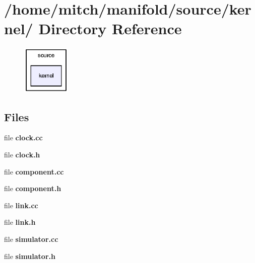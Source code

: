 \section{/home/mitch/manifold/source/kernel/ Directory Reference}
\label{dir_20aff94f87d25d69b06593913066a51b}


\nopagebreak
\begin{figure}[H]
\begin{center}
\leavevmode
\includegraphics[width=65pt]{dir_20aff94f87d25d69b06593913066a51b_dep}
\end{center}
\end{figure}
\subsection*{Files}
\begin{CompactItemize}
\item 
file {\bf clock.cc}
\item 
file {\bf clock.h}
\item 
file {\bf component.cc}
\item 
file {\bf component.h}
\item 
file {\bf link.cc}
\item 
file {\bf link.h}
\item 
file {\bf simulator.cc}
\item 
file {\bf simulator.h}
\end{CompactItemize}
